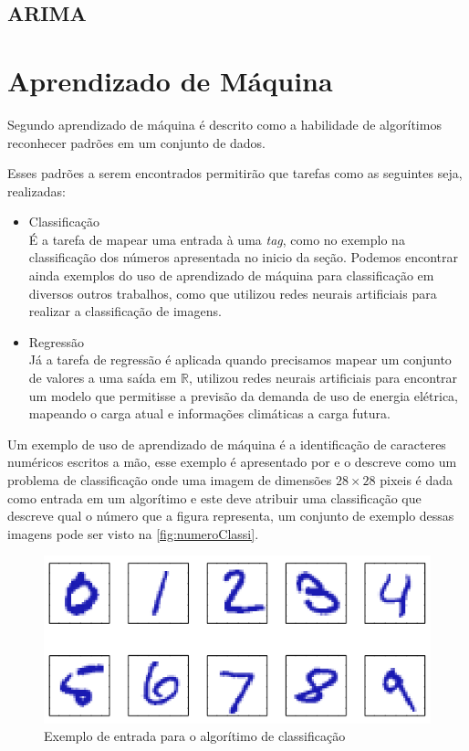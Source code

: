 \documentclass[
	12pt,
	oneside,
	a4paper,
	english,
	brazil
]{abntex2}
\begin{document}

\subsection{ARIMA}

\section{Aprendizado de Máquina}

Segundo  aprendizado de máquina é descrito como a 
habilidade de algorítimos reconhecer padrões em um conjunto de dados.

Esses padrões a serem encontrados permitirão que tarefas como as seguintes seja, 
realizadas:
\begin{itemize}
    \item Classificação\\
        É a tarefa de mapear uma entrada à uma \textit{tag}, como no exemplo na 
        classificação dos números apresentada no inicio da seção. Podemos 
        encontrar ainda exemplos do uso de aprendizado de máquina para 
        classificação em diversos outros trabalhos, como 
         que utilizou redes neurais artificiais 
        para realizar a classificação de imagens.
    \item Regressão\\
        Já a tarefa de regressão é aplicada quando precisamos mapear um conjunto 
        de valores a uma saída em $ \mathbb{R} $,  
        utilizou redes neurais artificiais para encontrar um modelo que 
        permitisse a previsão da demanda de uso de energia elétrica, mapeando o 
        carga atual e informações climáticas a carga futura.
\end{itemize}

Um exemplo de uso de aprendizado de máquina é a identificação de caracteres 
numéricos escritos a mão, esse exemplo é apresentado por 
 e o descreve como um problema de classificação onde 
uma imagem de dimensões $28 \times 28$ pixeis é dada como entrada em um 
algorítimo e este deve atribuir uma classificação que descreve qual o número que 
a figura representa, um conjunto de exemplo dessas imagens pode ser visto na 
\autoref{fig:numeroClassi}.

\begin{figure}
    \centering
    \caption{Exemplo de entrada para o algorítimo de 
    classificação}\label{fig:numeroClassi}
    \includegraphics[width=.6\linewidth]{images/numeroClassificacao.png}
\end{figure}
\end{document}

